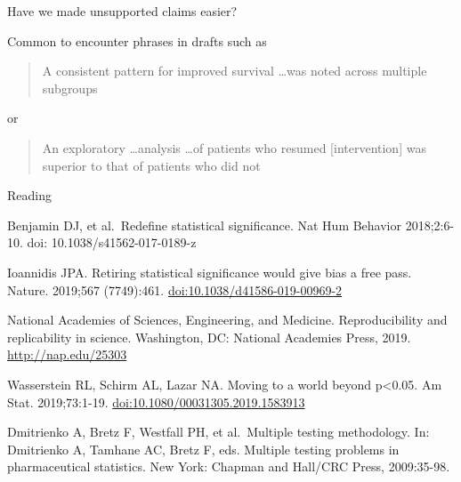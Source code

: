 \documentclass[ignorenonframetext,]{beamer}
\begin{document}
\begin{frame}{Have we made unsupported claims easier?}
\protect\hypertarget{have-we-made-unsupported-claims-easier}{}

Common to encounter phrases in drafts such as

\begin{quote} A consistent pattern for improved survival \ldots was noted across multiple subgroups
\end{quote}

or

\begin{quote}

An exploratory \ldots analysis \ldots of patients who resumed [intervention]  was superior to that of patients who did not

\end{quote}

\end{frame}

\begin{frame}{Reading}
\protect\hypertarget{reading}{}

\small

Benjamin DJ, et al.~Redefine statistical significance. Nat Hum Behavior
2018;2:6-10. doi: 10.1038/s41562-017-0189-z

Ioannidis JPA. Retiring statistical significance would give bias a free
pass. Nature. 2019;567 (7749):461. \url{doi:10.1038/d41586-019-00969-2}

National Academies of Sciences, Engineering, and Medicine.
Reproducibility and replicability in science. Washington, DC: National
Academies Press, 2019. \url{http://nap.edu/25303}

Wasserstein RL, Schirm AL, Lazar NA. Moving to a world beyond
p\textless{}0.05. Am Stat. 2019;73:1-19.
\url{doi:10.1080/00031305.2019.1583913}

Dmitrienko A, Bretz F, Westfall PH, et al.~Multiple testing methodology.
In: Dmitrienko A, Tamhane AC, Bretz F, eds. Multiple testing problems in
pharmaceutical statistics. New York: Chapman and Hall/CRC Press,
2009:35-98.

\end{frame}
\end{document}
